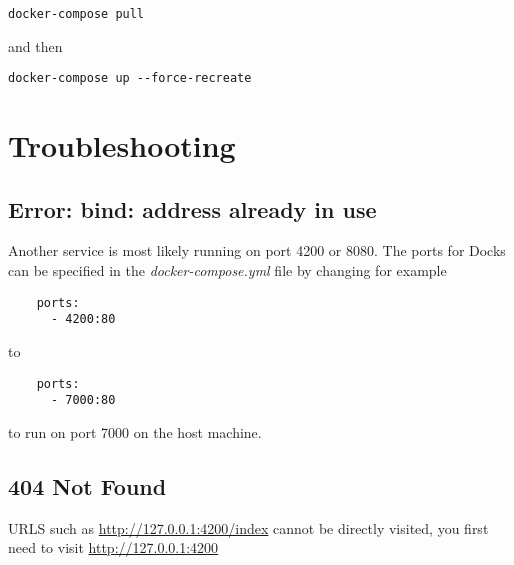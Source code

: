 \documentclass[]{article}
\begin{document}
\begin{lstlisting}
docker-compose pull
\end{lstlisting}

and then

\begin{lstlisting}
docker-compose up --force-recreate
\end{lstlisting}

\section{Troubleshooting}
\subsection{Error: bind: address already in use}
Another service is most likely running on port 4200 or 8080. The ports for Docks
can be specified in the \emph{docker-compose.yml} file by changing for example

\begin{lstlisting}
    ports:
      - 4200:80
\end{lstlisting}
to
\begin{lstlisting}
    ports:
      - 7000:80
\end{lstlisting}
to run on port 7000 on the host machine.

\subsection{404 Not Found}
URLS such as \url{http://127.0.0.1:4200/index} cannot be directly visited, you first need to visit \url{http://127.0.0.1:4200}
\end{document}
